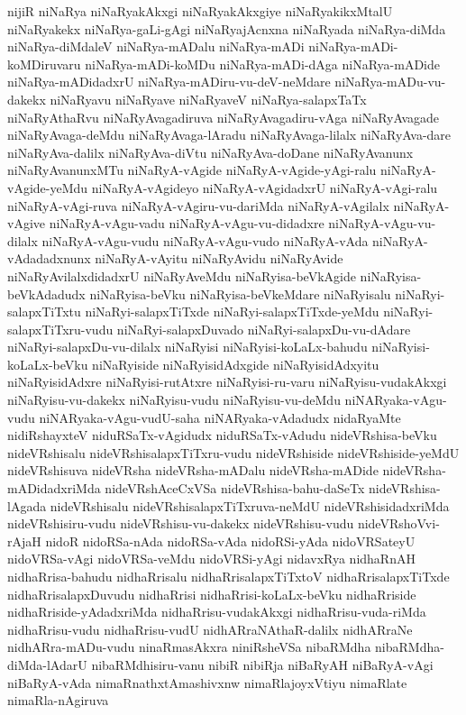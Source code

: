 {nijiR
niNaRya
niNaRyakAkxgi
niNaRyakAkxgiye
niNaRyakikxMtalU
niNaRyakekx
niNaRya-gaLi-gAgi
niNaRyajAcnxna
niNaRyada
niNaRya-diMda
niNaRya-diMdaleV
niNaRya-mADalu
niNaRya-mADi
niNaRya-mADi-koMDiruvaru
niNaRya-mADi-koMDu
niNaRya-mADi-dAga
niNaRya-mADide
niNaRya-mADidadxrU
niNaRya-mADiru-vu-deV-neMdare
niNaRya-mADu-vu-dakekx
niNaRyavu
niNaRyave
niNaRyaveV
niNaRya-salapxTaTx
niNaRyAthaRvu
niNaRyAvagadiruva
niNaRyAvagadiru-vAga
niNaRyAvagade
niNaRyAvaga-deMdu
niNaRyAvaga-lAradu
niNaRyAvaga-lilalx
niNaRyAva-dare
niNaRyAva-dalilx
niNaRyAva-diVtu
niNaRyAva-doDane
niNaRyAvanunx
niNaRyAvanunxMTu
niNaRyA-vAgide
niNaRyA-vAgide-yAgi-ralu
niNaRyA-vAgide-yeMdu
niNaRyA-vAgideyo
niNaRyA-vAgidadxrU
niNaRyA-vAgi-ralu
niNaRyA-vAgi-ruva
niNaRyA-vAgiru-vu-dariMda
niNaRyA-vAgilalx
niNaRyA-vAgive
niNaRyA-vAgu-vadu
niNaRyA-vAgu-vu-didadxre
niNaRyA-vAgu-vu-dilalx
niNaRyA-vAgu-vudu
niNaRyA-vAgu-vudo
niNaRyA-vAda
niNaRyA-vAdadadxnunx
niNaRyA-vAyitu
niNaRyAvidu
niNaRyAvide
niNaRyAvilalxdidadxrU
niNaRyAveMdu
niNaRyisa-beVkAgide
niNaRyisa-beVkAdadudx
niNaRyisa-beVku
niNaRyisa-beVkeMdare
niNaRyisalu
niNaRyi-salapxTiTxtu
niNaRyi-salapxTiTxde
niNaRyi-salapxTiTxde-yeMdu
niNaRyi-salapxTiTxru-vudu
niNaRyi-salapxDuvado
niNaRyi-salapxDu-vu-dAdare
niNaRyi-salapxDu-vu-dilalx
niNaRyisi
niNaRyisi-koLaLx-bahudu
niNaRyisi-koLaLx-beVku
niNaRyiside
niNaRyisidAdxgide
niNaRyisidAdxyitu
niNaRyisidAdxre
niNaRyisi-rutAtxre
niNaRyisi-ru-varu
niNaRyisu-vudakAkxgi
niNaRyisu-vu-dakekx
niNaRyisu-vudu
niNaRyisu-vu-deMdu
niNARyaka-vAgu-vudu
niNARyaka-vAgu-vudU-saha
niNARyaka-vAdadudx
nidaRyaMte
nidiRshayxteV
niduRSaTx-vAgidudx
niduRSaTx-vAdudu
nideVRshisa-beVku
nideVRshisalu
nideVRshisalapxTiTxru-vudu
nideVRshiside
nideVRshiside-yeMdU
nideVRshisuva
nideVRsha
nideVRsha-mADalu
nideVRsha-mADide
nideVRsha-mADidadxriMda
nideVRshAceCxVSa
nideVRshisa-bahu-daSeTx
nideVRshisa-lAgada
nideVRshisalu
nideVRshisalapxTiTxruva-neMdU
nideVRshisidadxriMda
nideVRshisiru-vudu
nideVRshisu-vu-dakekx
nideVRshisu-vudu
nideVRshoVvi-rAjaH
nidoR
nidoRSa-nAda
nidoRSa-vAda
nidoRSi-yAda
nidoVRSateyU
nidoVRSa-vAgi
nidoVRSa-veMdu
nidoVRSi-yAgi
nidavxRya
nidhaRnAH
nidhaRrisa-bahudu
nidhaRrisalu
nidhaRrisalapxTiTxtoV
nidhaRrisalapxTiTxde
nidhaRrisalapxDuvudu
nidhaRrisi
nidhaRrisi-koLaLx-beVku
nidhaRriside
nidhaRriside-yAdadxriMda
nidhaRrisu-vudakAkxgi
nidhaRrisu-vuda-riMda
nidhaRrisu-vudu
nidhaRrisu-vudU
nidhARraNAthaR-dalilx
nidhARraNe
nidhARra-mADu-vudu
ninaRmasAkxra
niniRsheVSa
nibaRMdha
nibaRMdha-diMda-lAdarU
nibaRMdhisiru-vanu
nibiR
nibiRja
niBaRyAH
niBaRyA-vAgi
niBaRyA-vAda
nimaRnathxtAmashivxnw
nimaRlajoyxVtiyu
nimaRlate
nimaRla-nAgiruva
}
